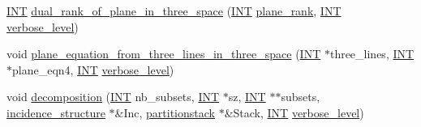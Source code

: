 \begin{DoxyCompactItemize}
\item 
\mbox{\hyperlink{galois_8h_a09fddde158a3a20bd2dcadb609de11dc}{I\+NT}} \mbox{\hyperlink{classprojective__space_aec560e1265b1b700f47c369c4df07c7c}{dual\+\_\+rank\+\_\+of\+\_\+plane\+\_\+in\+\_\+three\+\_\+space}} (\mbox{\hyperlink{galois_8h_a09fddde158a3a20bd2dcadb609de11dc}{I\+NT}} \mbox{\hyperlink{hamming_8_c_acfecf66be342ea15d6ee6117385e506e}{plane\+\_\+rank}}, \mbox{\hyperlink{galois_8h_a09fddde158a3a20bd2dcadb609de11dc}{I\+NT}} \mbox{\hyperlink{simeon_8_c_a818073fbcc2f439e7c56952f67386122}{verbose\+\_\+level}})
\item 
void \mbox{\hyperlink{classprojective__space_a173dd43f3b5720f46ab372c370f4687c}{plane\+\_\+equation\+\_\+from\+\_\+three\+\_\+lines\+\_\+in\+\_\+three\+\_\+space}} (\mbox{\hyperlink{galois_8h_a09fddde158a3a20bd2dcadb609de11dc}{I\+NT}} $\ast$three\+\_\+lines, \mbox{\hyperlink{galois_8h_a09fddde158a3a20bd2dcadb609de11dc}{I\+NT}} $\ast$plane\+\_\+eqn4, \mbox{\hyperlink{galois_8h_a09fddde158a3a20bd2dcadb609de11dc}{I\+NT}} \mbox{\hyperlink{simeon_8_c_a818073fbcc2f439e7c56952f67386122}{verbose\+\_\+level}})
\item 
void \mbox{\hyperlink{classprojective__space_ae060ee525e7a974bce04d78be7f6dd51}{decomposition}} (\mbox{\hyperlink{galois_8h_a09fddde158a3a20bd2dcadb609de11dc}{I\+NT}} nb\+\_\+subsets, \mbox{\hyperlink{galois_8h_a09fddde158a3a20bd2dcadb609de11dc}{I\+NT}} $\ast$sz, \mbox{\hyperlink{galois_8h_a09fddde158a3a20bd2dcadb609de11dc}{I\+NT}} $\ast$$\ast$subsets, \mbox{\hyperlink{classincidence__structure}{incidence\+\_\+structure}} $\ast$\&Inc, \mbox{\hyperlink{classpartitionstack}{partitionstack}} $\ast$\&Stack, \mbox{\hyperlink{galois_8h_a09fddde158a3a20bd2dcadb609de11dc}{I\+NT}} \mbox{\hyperlink{simeon_8_c_a818073fbcc2f439e7c56952f67386122}{verbose\+\_\+level}})
\end{DoxyCompactItemize}
